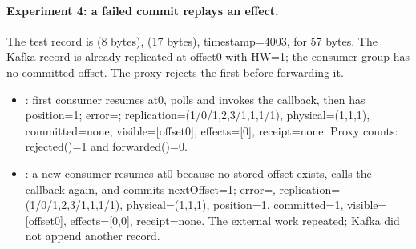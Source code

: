 \paragraph{Experiment 4: a failed commit replays an effect.}The test record is  (8 bytes),  (17 bytes), timestamp=4003, for 57 bytes. The Kafka record is already replicated at offset0 with HW=1; the consumer group has no committed offset. The proxy rejects the first  before forwarding it.
\begin{itemize}
\item {}: first consumer resumes at0, polls and invokes the callback, then has position=1; error=; replication=(1/0/{1,2,3}/{1,1,1}/1), physical=(1,1,1), committed=none, visible=[offset0], effects=[0], receipt=none. Proxy counts: rejected()=1 and forwarded()=0.
\item {}: a new consumer resumes at0 because no stored offset exists, calls the callback again, and commits nextOffset=1; error=, replication=(1/0/{1,2,3}/{1,1,1}/1), physical=(1,1,1), position=1, committed=1, visible=[offset0], effects=[0,0], receipt=none. The external work repeated; Kafka did not append another record.
\end{itemize}
